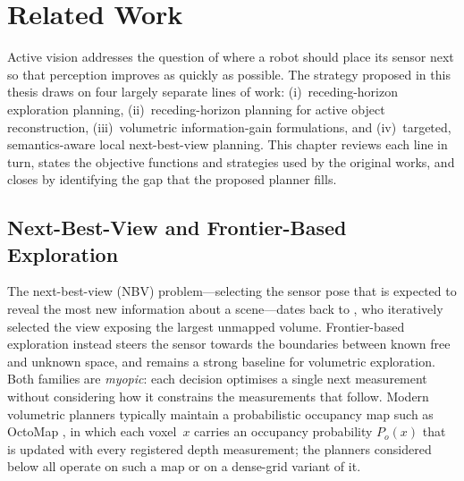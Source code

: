 \chapter{Related Work}
\label{ch:related-work}

Active vision addresses the question of where a robot should place its
sensor next so that perception improves as quickly as possible. The
strategy proposed in this thesis draws on four largely separate lines of
work: (i)~receding-horizon exploration planning, (ii)~receding-horizon
planning for active object reconstruction, (iii)~volumetric
information-gain formulations, and (iv)~targeted, semantics-aware local
next-best-view planning. This chapter reviews each line in turn, states
the objective functions and strategies used by the original works, and
closes by identifying the gap that the proposed planner fills.

\section{Next-Best-View and Frontier-Based Exploration}
\label{sec:rw-nbv}

The next-best-view (NBV) problem---selecting the sensor pose that is
expected to reveal the most new information about a scene---dates back to
\textcite{connolly1985}, who iteratively selected the view exposing the
largest unmapped volume. Frontier-based exploration
\parencite{yamauchi1997} instead steers the sensor towards the boundaries
between known free and unknown space, and remains a strong baseline for
volumetric exploration. Both families are \emph{myopic}: each decision
optimises a single next measurement without considering how it
constrains the measurements that follow. Modern volumetric planners
typically maintain a probabilistic occupancy map such as OctoMap
\parencite{hornung2013}, in which each voxel~$x$ carries an occupancy
probability $P_o(x)$ that is updated with every registered depth
measurement; the planners considered below all operate on such a map or
on a dense-grid variant of it.

